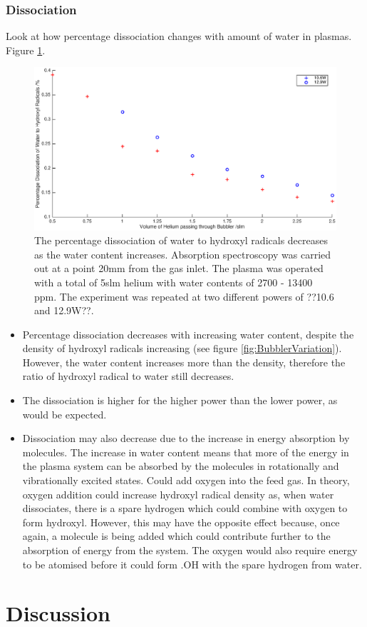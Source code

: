 \documentclass[11pt, oneside]{article}   	%
\begin{document}
\subsubsection{Dissociation}

Look at how percentage dissociation changes with amount of water in plasmas. Figure \ref{fig:BubblerDissociation}.

\begin{figure}
    \centering
    \includegraphics[width=\textwidth]{Figures/BubblerDissociation.eps}
    \caption{The percentage dissociation of water to hydroxyl radicals decreases as the water content increases. Absorption spectroscopy was carried out at a point 20mm from the gas inlet. The plasma was operated with a total of 5slm helium with water contents of 2700 - 13400 ppm. The experiment was repeated at two different powers of ??10.6 and 12.9W??.}
    \label{fig:BubblerDissociation}
\end{figure}

\begin{itemize}
    \item Percentage dissociation decreases with increasing water content, despite the density of hydroxyl radicals increasing (see figure \ref{fig:BubblerVariation}). However, the water content increases more than the density, therefore the ratio of hydroxyl radical to water still decreases.
    \item The dissociation is higher for the higher power than the lower power, as would be expected. 
    \item Dissociation may also decrease due to the increase in energy absorption by molecules. The increase in water content means that more of the energy in the plasma system can be absorbed by the molecules in rotationally and vibrationally excited states. Could add oxygen into the feed gas. In theory, oxygen addition could increase hydroxyl radical density as, when water dissociates, there is a spare hydrogen which could combine with oxygen to form hydroxyl. However, this may have the opposite effect because, once again, a molecule is being added which could contribute further to the absorption of energy from the system. The oxygen would also require energy to be atomised before it could form .OH with the spare hydrogen from water.
\end{itemize}




\section{Discussion}
\end{document}

